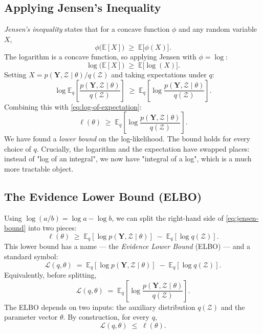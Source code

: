 \documentclass[11pt, a4paper, oneside]{article}
\newcommand{\mY}{\mathbf{Y}}
\begin{document}
\subsection{Applying Jensen's Inequality}

\emph{Jensen's inequality} states that for a concave function $\phi$ and
any random variable $X$,
\[
\phi\big(\mathbb{E}[X]\big) \;\geq\; \mathbb{E}\big[\phi(X)\big].
\]
The logarithm is a concave function, so applying Jensen with $\phi = \log$:
\[
\log\big(\mathbb{E}[X]\big) \;\geq\; \mathbb{E}\big[\log(X)\big].
\]
Setting $X = p(\mY, \mathcal{Z} \mid \theta) / q(\mathcal{Z})$ and taking
expectations under $q$:
\[
\log \mathbb{E}_q\!\left[\frac{p(\mY, \mathcal{Z} \mid \theta)}{q(\mathcal{Z})}\right]
\;\geq\;
\mathbb{E}_q\!\left[\log \frac{p(\mY, \mathcal{Z} \mid \theta)}{q(\mathcal{Z})}\right].
\]
Combining this with \eqref{eq:log-of-expectation}:
\begin{equation}
\ell(\theta) \;\geq\;
\mathbb{E}_q\!\left[\log \frac{p(\mY, \mathcal{Z} \mid \theta)}{q(\mathcal{Z})}\right].
\label{eq:jensen-bound}
\end{equation}
We have found a \emph{lower bound} on the log-likelihood. The bound holds
for every choice of $q$. Crucially, the logarithm and the expectation
have swapped places: instead of "log of an integral", we now have
"integral of a log", which is a much more tractable object.

\subsection{The Evidence Lower Bound (ELBO)}

Using $\log(a/b) = \log a - \log b$, we can split the right-hand side of
\eqref{eq:jensen-bound} into two pieces:
\[
\ell(\theta) \;\geq\; \mathbb{E}_q[\log p(\mY, \mathcal{Z} \mid \theta)]
\;-\; \mathbb{E}_q[\log q(\mathcal{Z})].
\]
This lower bound has a name — the \emph{Evidence Lower Bound} (ELBO) —
and a standard symbol:
\begin{equation}
\boxed{\;\;
\mathcal{L}(q, \theta) \;=\; \mathbb{E}_q[\log p(\mY, \mathcal{Z} \mid \theta)]
\;-\; \mathbb{E}_q[\log q(\mathcal{Z})].
\;\;}
\label{eq:elbo}
\end{equation}
Equivalently, before splitting,
\[
\mathcal{L}(q, \theta) \;=\; \mathbb{E}_q\!\left[\log \frac{p(\mY, \mathcal{Z} \mid \theta)}{q(\mathcal{Z})}\right].
\]
The ELBO depends on two inputs: the auxiliary distribution $q(\mathcal{Z})$
and the parameter vector $\theta$. By construction, for every $q$,
\[
\mathcal{L}(q, \theta) \;\leq\; \ell(\theta).
\]
\end{document}
